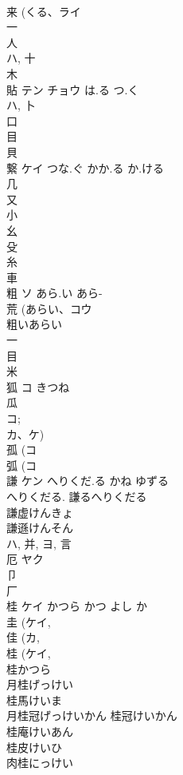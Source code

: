 \documentclass[8pt]{extreport}
\begin{document}
\begin{CJK}{UTF8}{min}
\\	来 (くる、ライ 
\\	一 
\\	人 
\\	ハ, 十 
\\	木 
\\	貼	テン チョウ	は.る つ.く	
\\	ハ, 卜 
\\	口 
\\	目 
\\	貝 
\\	繋	ケイ	つな.ぐ かか.る か.ける	
\\	几 
\\	又 
\\	小 
\\	幺 
\\	殳 
\\	糸 
\\	車 
\\	粗	ソ	あら.い あら-	
\\	荒 (あらい、コウ 
\\	粗いあらい 
\\	一 
\\	目 
\\	米 
\\	狐	コ	きつね	
\\	瓜 
\\	コ; 
\\	カ、ケ) 
\\	孤 (コ 
\\	弧 (コ 
\\	謙	ケン	へりくだ.る かね ゆずる	
\\	へりくだる.		謙るへりくだる
\\	謙虚けんきょ
\\	謙遜けんそん
\\	ハ, 并, ヨ, 言 
\\	厄	ヤク		
\\	卩 
\\	厂 
\\	桂	ケイ	かつら かつ よし か	
\\	圭 (ケイ, 
\\	佳 (カ, 
\\	桂 (ケイ, 
\\	桂かつら 
\\	月桂げっけい 
\\	桂馬けいま 
\\	月桂冠げっけいかん 桂冠けいかん 
\\	桂庵けいあん 
\\	桂皮けいひ 
\\	肉桂にっけい 

\end{CJK}
\end{document}
